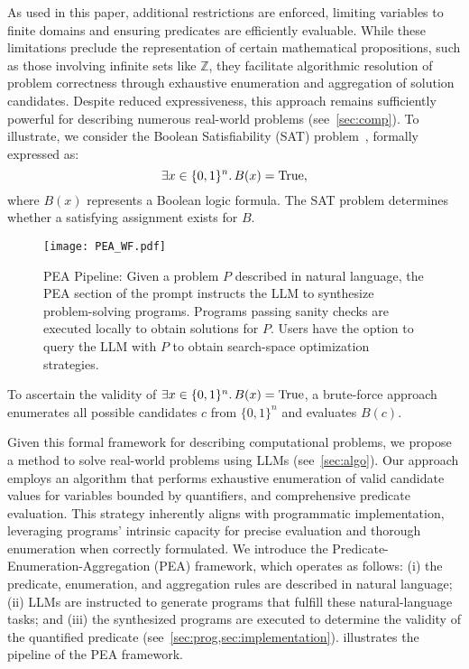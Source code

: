 As used in this paper, additional
restrictions are enforced, limiting variables to finite domains and ensuring predicates are efficiently evaluable. While these limitations preclude the representation of certain mathematical propositions, such as those involving infinite sets like $\mathbb{Z}$, they facilitate algorithmic resolution of problem correctness through exhaustive enumeration and aggregation of solution candidates. Despite reduced expressiveness, this approach remains sufficiently powerful for describing numerous real-world problems (see~\cref{sec:comp}). To illustrate, we consider the Boolean Satisfiability (SAT) problem~\citep{Karp1972}, formally expressed as:
\[
\exists x\in\{0, 1\}^n\ldotp B(x)=\text{True},
\]
where $B(x)$ represents a Boolean logic formula.  The SAT problem determines whether a satisfying assignment exists for $B$.
\begin{figure*}
    \centering
    \texttt{[image: PEA\_WF.pdf]}
    \caption{PEA Pipeline: Given a problem $P$ described in natural language, the PEA section of the prompt instructs the LLM to synthesize problem-solving programs. Programs passing sanity checks are executed locally to obtain solutions for $P$. Users have the option to query the LLM with $P$ to obtain search-space optimization strategies.}\label{fig:pipeline}
    \vspace{-7pt}
\end{figure*}
To ascertain the validity of $\exists x\in\{0, 1\}^n\ldotp B(x)=\text{True}$, a brute-force approach enumerates all possible candidates $c$ from $\{0, 1\}^n$ and evaluates $B(c)$.


Given this formal framework for describing computational problems, we propose a method to solve real-world problems using LLMs (see~\cref{sec:algo}). 
Our approach employs
an algorithm that performs
exhaustive enumeration of
valid candidate values for variables bounded by quantifiers,
and comprehensive predicate evaluation. This strategy inherently aligns with programmatic implementation, leveraging programs' intrinsic capacity for precise evaluation and thorough enumeration when correctly formulated.
We introduce the Predicate-Enumeration-Aggregation (PEA) framework, which operates as follows:
(i) the predicate, enumeration,
and aggregation rules are described in natural language;
(ii) LLMs are instructed to generate programs that fulfill these natural-language tasks; and
(iii) the synthesized programs are executed to determine the validity of the quantified predicate (see~\cref{sec:prog,sec:implementation}).
 illustrates the pipeline of the PEA framework.



